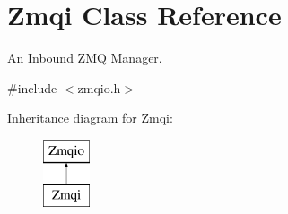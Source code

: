 \hypertarget{classZmqi}{\section{Zmqi Class Reference}
\label{classZmqi}
}


An Inbound Z\-M\-Q Manager.  




{\ttfamily \#include $<$zmqio.\-h$>$}

Inheritance diagram for Zmqi\-:\begin{figure}[H]
\begin{center}
\leavevmode
\includegraphics[height=2.000000cm]{classZmqi}
\end{center}
\end{figure}
